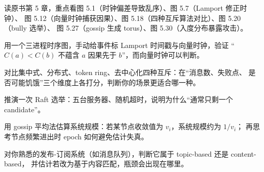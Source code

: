 \begin{actions}
  \item 读原书第 5 章，重点看图 5.1（时钟偏差导致乱序）、图 5.7（Lamport 修正时钟）、
        图 5.12（向量时钟捕获因果）、图 5.18（四种互斥算法对比）、图 5.20（bully 选举）、
        图 5.27（gossip 生成 torus）、图 5.30（入度分布暴露攻击）。
  \item 用一个三进程时序图，手动给事件标 Lamport 时间戳与向量时钟，验证
        “$C(a)<C(b)$ 不蕴含 $a$ 因果先于 $b$”，而向量时钟可以判断。
  \item 对比集中式、分布式、token ring、去中心化四种互斥：在“消息数、失败点、
        是否可能饥饿”三个维度上各打分，判断你的场景更适合哪一种。
  \item 推演一次 Raft 选举：五台服务器、随机超时，说明为什么“通常只剩一个 candidate”。
  \item 用 gossip 平均法估算系统规模：若某节点收敛值为 $v_i$，系统规模约为 $1/v_i$；
        再思考节点频繁进出时 epoch 如何避免估计失真。
  \item 对你熟悉的发布-订阅系统（如消息队列），判断它属于 topic-based 还是 content-based，
        并估计若改为基于内容匹配，瓶颈会出现在哪里。
\end{actions}
